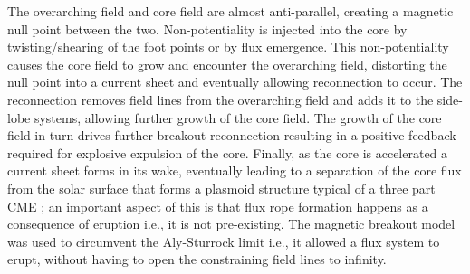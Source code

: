 The overarching field and core field are almost anti-parallel, creating a magnetic null point between the two. Non-potentiality is injected into the core by twisting/shearing of the foot points or by flux emergence. This non-potentiality causes the core field to grow and encounter the overarching field, distorting the null point into a current sheet and eventually allowing reconnection to occur. The reconnection removes field lines from the overarching field and adds it to the side-lobe systems, allowing further growth of the core field. The growth of the core field in turn drives further breakout reconnection resulting in a positive feedback required for explosive expulsion of the core. Finally, as the core is accelerated a current sheet forms in its wake, eventually leading to a separation of the core flux from the solar surface that forms a plasmoid structure typical of a three part CME \citep{lynch2004}; an important aspect of this is that flux rope formation happens as a consequence of eruption i.e., it is not pre-existing. The magnetic breakout model was used to circumvent the Aly-Sturrock limit \citep{aly1991, sturrock1991} i.e., it allowed a flux system to erupt, without having to open the constraining field lines to infinity.



